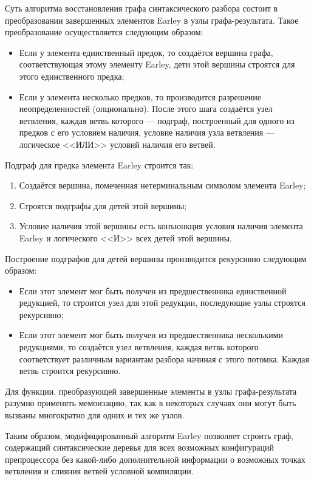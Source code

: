 Суть алгоритма восстановления графа синтаксического разбора состоит в преобразовании завершенных элементов Earley в узлы графа-результата. Такое преобразование осуществляется следующим образом:

\begin{itemize}
\item Если у элемента единственный предок, то создаётся вершина графа, соответствующая этому элементу Earley, дети этой вершины строятся для этого единственного предка;
\item Если у элемента несколько предков, то производится разрешение неопределенностей (опционально). После этого шага создаётся узел ветвления, каждая ветвь которого --- подграф, построенный для одного из предков с его условием наличия, условие наличия узла ветвления --- логическое <<ИЛИ>> условий наличия его ветвей.
\end{itemize}

Подграф для предка элемента Earley строится так:

\begin{enumerate}
\item Создаётся вершина, помеченная нетерминальным символом элемента Earley;
\item Строятся подграфы для детей этой вершины;
\item Условие наличия этой вершины есть конъюнкция условия наличия элемента Earley и логического <<И>> всех детей этой вершины.
\end{enumerate}

Построение подграфов для детей вершины производится рекурсивно следующим образом:

\begin{itemize}
\item Если этот элемент мог быть получен из предшественника единственной редукцией, то строится узел для этой редукции, последующие узлы строятся рекурсивно;
\item Если этот элемент мог быть получен из предшественника несколькими редукциями, то создаётся узел ветвления, каждая ветвь которого соответствует различным вариантам разбора начиная с этого потомка. Каждая ветвь строится рекурсивно.
\end{itemize}

Для функции, преобразующей завершенные элементы в узлы графа-результата разумно применять мемоизацию, так как в некоторых случаях они могут быть вызваны многократно для одних и тех же узлов.

Таким образом, модифицированный алгоритм Earley позволяет строить граф, содержащий синтаксические деревья для всех возможных конфигураций препроцессора без какой-либо дополнительной информации о возможных точках ветвления и слияния ветвей условной компиляции.

